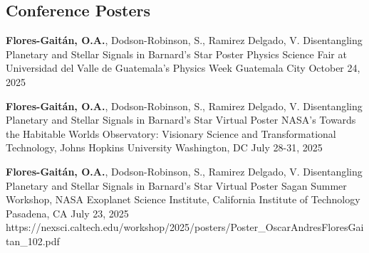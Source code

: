 \subsection*{Conference Posters}
\begin{onecolentry}
\begin{etaremune}
    \resumeTalkEntry
        {\textbf{Flores-Gaitán, O.A.}, Dodson-Robinson, S., Ramirez Delgado, V.}
        {Disentangling Planetary and Stellar Signals in Barnard’s Star}
        {Poster}
        {Physics Science Fair at Universidad del Valle de Guatemala's Physics Week}
        {Guatemala City}
        {October 24, 2025}
        {}

    \resumeTalkEntry
        {\textbf{Flores-Gaitán, O.A.}, Dodson-Robinson, S., Ramirez Delgado, V.}
        {Disentangling Planetary and Stellar Signals in Barnard’s Star}
        {Virtual Poster}
        {NASA's Towards the Habitable Worlds Observatory: Visionary Science and Transformational Technology, Johns Hopkins University}
        {Washington, DC}
        {July 28-31, 2025}
        {}

    \resumeTalkEntry
        {\textbf{Flores-Gaitán, O.A.}, Dodson-Robinson, S., Ramirez Delgado, V.}
        {Disentangling Planetary and Stellar Signals in Barnard’s Star}
        {Virtual Poster}
        {Sagan Summer Workshop, NASA Exoplanet Science Institute, California Institute of Technology}
        {Pasadena, CA}
        {July 23, 2025}
        {https://nexsci.caltech.edu/workshop/2025/posters/Poster_OscarAndresFloresGaitan_102.pdf}
\end{etaremune}
\end{onecolentry}

